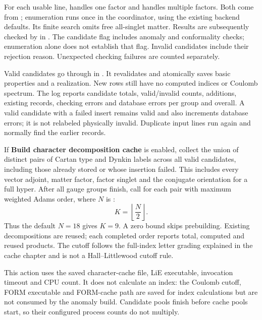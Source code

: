 For each usable line,  handles one
factor and  handles multiple factors.
Both come from ; enumeration runs once in the
coordinator, using the existing backend defaults. Its finite search omits free
all-singlet matter. Results are subsequently checked by
 in .
The candidate flag includes anomaly and conformality checks; enumeration alone
does not establish that flag. Invalid candidates include their rejection reason.
Unexpected checking failures are counted separately.

Valid candidates go through  in
. It revalidates and atomically saves basic properties
and a realization. New rows still have no computed indices or Coulomb spectrum.
The log reports candidate totals, valid/invalid counts, additions, existing
records, checking errors and database errors per group and overall. A valid
candidate with a failed insert remains valid and also increments database
errors; it is not relabeled physically invalid. Duplicate input lines run again
and normally find the earlier records.

If \textbf{Build character decomposition cache} is enabled, collect the union
of distinct pairs of Cartan type and Dynkin labels across all valid
candidates, including those already stored or whose insertion failed. This
includes every vector adjoint, matter factor, factor singlet and the conjugate
orientation for a full hyper. After all gauge groups finish, call
 for each pair
with maximum weighted Adams order, where $N$ is :
\[
 K=\left\lfloor\frac{N}{2}\right\rfloor.
\]
Thus the default $N=18$ gives $K=9$. A zero bound skips prebuilding. Existing
decompositions are reused; each completed order reports total, computed and
reused products. The cutoff follows the full-index letter grading explained in
the cache chapter and is not a Hall--Littlewood cutoff rule.

This action uses the saved character-cache file, LiE executable, invocation
timeout and CPU count. It does not calculate an index: the Coulomb cutoff,
FORM executable and FORM-cache path are saved for index calculations but are
not consumed by the anomaly build. Candidate pools finish before cache pools
start, so their configured process counts do not multiply.

